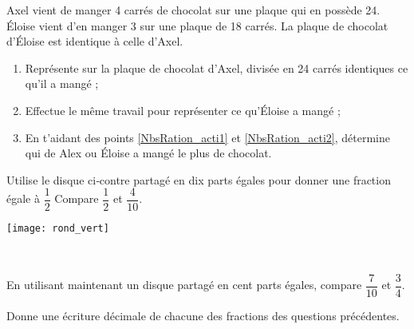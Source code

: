 
\begin{activite}

\begin{partie}
Axel vient de manger 4 carrés de chocolat sur une plaque qui en possède 24. Éloise vient d'en manger 3 sur une plaque de 18 carrés. La plaque de chocolat d'Éloise est identique à celle d'Axel.
\begin{enumerate}
 \item Représente sur la plaque de chocolat d'Axel, divisée en 24 carrés identiques ce qu'il a mangé ; \label{NbsRation_acti1}
 \item Effectue le même travail pour représenter ce qu'Éloise a mangé ; \label{NbsRation_acti2}
 \item En t'aidant des points \ref{NbsRation_acti1} et \ref{NbsRation_acti2}, détermine qui de Alex ou Éloise a mangé le plus de chocolat.
 \end{enumerate}
\end{partie}

\begin{minipage}[c]{0.78\linewidth}
\begin{partie}
Utilise le disque ci‑contre partagé en dix parts égales pour donner une fraction égale à $\dfrac{1}{2}$ Compare $\dfrac{1}{2}$ et $\dfrac{4}{10}$.
\end{partie}
\end{minipage} \hfill%
\begin{minipage}[c]{0.18\linewidth}
 \texttt{[image: rond\_vert]}
 \end{minipage} \\

\begin{partie}
En utilisant maintenant un disque partagé en cent parts égales, compare $\dfrac{7}{10}$ et $\dfrac{3}{4}$.
\end{partie}

\begin{partie}
Donne une écriture décimale de chacune des fractions des questions précédentes.
\end{partie}

\end{activite}


